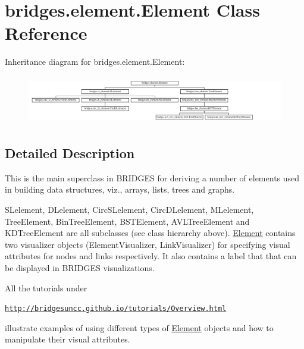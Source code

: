 \hypertarget{classbridges_1_1element_1_1_element}{}\section{bridges.\+element.\+Element Class Reference}
\label{classbridges_1_1element_1_1_element}
Inheritance diagram for bridges.\+element.\+Element\+:\begin{figure}[H]
\begin{center}
\leavevmode
\includegraphics[height=2.145594cm]{classbridges_1_1element_1_1_element}
\end{center}
\end{figure}


\subsection{Detailed Description}
This is the main superclass in B\+R\+I\+D\+G\+ES for deriving a number of elements used in building data structures, viz., arrays, lists, trees and graphs. 

S\+Lelement, D\+Lelement, Circ\+S\+Lelement, Circ\+D\+Lelement, M\+Lelement, Tree\+Element, Bin\+Tree\+Element, B\+S\+T\+Element, A\+V\+L\+Tree\+Element and K\+D\+Tree\+Element are all subclasses (see class hierarchy above). \mbox{\hyperlink{classbridges_1_1element_1_1_element}{Element}} contains two visualizer objects (Element\+Visualizer, Link\+Visualizer) for specifying visual attributes for nodes and links respectively. It also contains a label that that can be displayed in B\+R\+I\+D\+G\+ES visualizations.

All the tutorials under

\href{http://bridgesuncc.github.io/tutorials/Overview.html}{\tt http\+://bridgesuncc.\+github.\+io/tutorials/\+Overview.\+html}

illustrate examples of using different types of \mbox{\hyperlink{classbridges_1_1element_1_1_element}{Element}} objects and how to manipulate their visual attributes.

